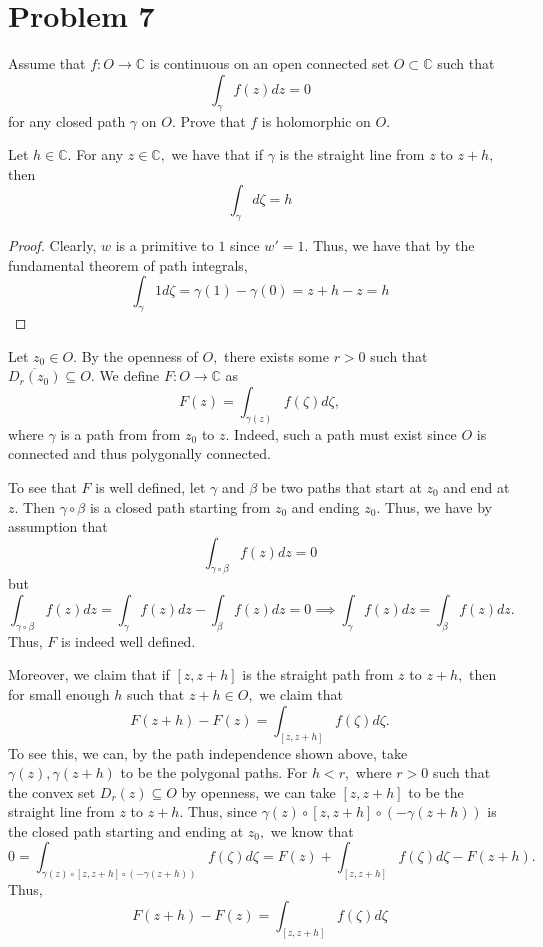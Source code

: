 \documentclass[11pt]{article}
\newcommand{\bbC}{\mathbb{C}}
\begin{document}
\section*{Problem 7}
\begin{problem}
Assume that $f: O\to \bbC$ is continuous on an open connected set $O\subset \bbC$ such that 
\[\int_\gamma f(z)dz = 0\] for any closed path $\gamma$ on $O.$ Prove that $f$ is holomorphic on $O.$     
\end{problem}
\begin{solution}
\begin{lemma}
    Let $h \in \bbC.$ For any $z\in \bbC,$ we have that if $\gamma$ is the straight line from $z$ to $z + h,$ then 
    \[\int_\gamma d\zeta = h\]
\end{lemma}
\begin{proof}
    Clearly, $w$ is a primitive to $1$ since $w' = 1.$ Thus, we have that by the fundamental theorem of path integrals,
    \[\int_\gamma 1 d\zeta = \gamma(1) - \gamma(0) = z + h - z = h\]
\end{proof}
    Let $z_0 \in O.$  By the openness of $O,$ there exists some $r>0$ such that $\overline{D_r(z_0)}\subseteq O.$ We define $F: O\to \bbC$ as 
    \[F(z) = \int_{\gamma(z)} f(\zeta)d\zeta,\] where $\gamma$ is a path from from $z_0$ to $z.$ Indeed, such a path must exist since $O$ is connected and thus polygonally connected. 

To see that $F$ is well defined, let $\gamma$ and $\beta$ be two paths that start at $z_0$ and end at $z.$ Then $\gamma \circ \beta$ is a closed path starting from $z_0$ and ending $z_0.$ Thus, we have by assumption that
\[\int_{\gamma \circ \beta} f(z)dz = 0\] but 
\[\int_{\gamma \circ \beta} f(z)dz= \int_\gamma f(z)dz - \int_\beta f(z)dz  =0 \implies \int_\gamma f(z)dz =\int_\beta f(z)dz.\] Thus, $F$ is indeed well defined.

Moreover, we claim that if $[z, z + h]$ is the straight path from $z$ to $z+h,$ then for small enough $h$ such that $z + h \in O,$ we claim that 
\[F(z+h) - F(z) = \int_{[z, z + h]} f(\zeta)d\zeta.\] To see this, we can, by the path independence shown above, take $\gamma(z), \gamma(z + h)$ to be the polygonal paths. For $h< r,$ where $r>0$ such that the convex set $D_r(z)\subseteq O$ by openness, we can take $[z,z + h]$ to be the straight line from $z$ to $z +h.$ Thus, since $\gamma(z)\circ [z,z +h] \circ (-\gamma(z + h))$ is the closed path starting and ending at $z_0,$ we know that 
\[0 = \int_{\gamma(z)\circ [z,z +h] \circ (-\gamma(z + h))}f(\zeta)d\zeta = F(z) + \int_{[z, z + h]}f(\zeta)d\zeta - F(z + h).\] Thus, 
\[F(z + h) - F(z) = \int_{[z, z + h]}f(\zeta)d\zeta\]
    

\end{solution}
\end{document}
